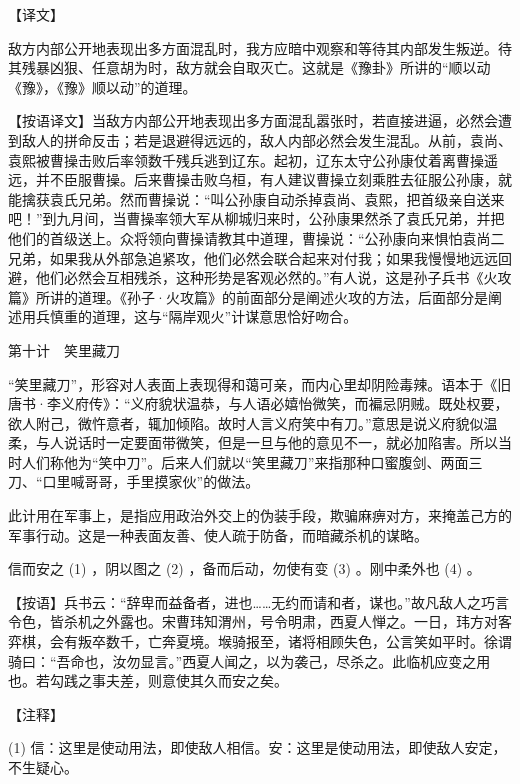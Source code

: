 \documentclass[12pt,UTF8]{ctexbook}
\begin{document}
【译文】


敌方内部公开地表现出多方面混乱时，我方应暗中观察和等待其内部发生叛逆。待其残暴凶狠、任意胡为时，敌方就会自取灭亡。这就是《豫卦》所讲的“顺以动《豫》，《豫》顺以动”的道理。

【按语译文】当敌方内部公开地表现出多方面混乱嚣张时，若直接进逼，必然会遭到敌人的拼命反击；若是退避得远远的，敌人内部必然会发生混乱。从前，袁尚、袁熙被曹操击败后率领数千残兵逃到辽东。起初，辽东太守公孙康仗着离曹操遥远，并不臣服曹操。后来曹操击败乌桓，有人建议曹操立刻乘胜去征服公孙康，就能擒获袁氏兄弟。然而曹操说：“叫公孙康自动杀掉袁尚、袁熙，把首级亲自送来吧！”到九月间，当曹操率领大军从柳城归来时，公孙康果然杀了袁氏兄弟，并把他们的首级送上。众将领向曹操请教其中道理，曹操说：“公孙康向来惧怕袁尚二兄弟，如果我从外部急追紧攻，他们必然会联合起来对付我；如果我慢慢地远远回避，他们必然会互相残杀，这种形势是客观必然的。”有人说，这是孙子兵书《火攻篇》所讲的道理。《孙子·火攻篇》的前面部分是阐述火攻的方法，后面部分是阐述用兵慎重的道理，这与“隔岸观火”计谋意思恰好吻合。





第十计　笑里藏刀


“笑里藏刀”，形容对人表面上表现得和蔼可亲，而内心里却阴险毒辣。语本于《旧唐书·李义府传》：“义府貌状温恭，与人语必嬉怡微笑，而褊忌阴贼。既处权要，欲人附己，微忤意者，辄加倾陷。故时人言义府笑中有刀。”意思是说义府貌似温柔，与人说话时一定要面带微笑，但是一旦与他的意见不一，就必加陷害。所以当时人们称他为“笑中刀”。后来人们就以“笑里藏刀”来指那种口蜜腹剑、两面三刀、“口里喊哥哥，手里摸家伙”的做法。

此计用在军事上，是指应用政治外交上的伪装手段，欺骗麻痹对方，来掩盖己方的军事行动。这是一种表面友善、使人疏于防备，而暗藏杀机的谋略。





信而安之 (1) ，阴以图之 (2) ，备而后动，勿使有变 (3) 。刚中柔外也 (4) 。

【按语】兵书云：“辞卑而益备者，进也……无约而请和者，谋也。”故凡敌人之巧言令色，皆杀机之外露也。宋曹玮知渭州，号令明肃，西夏人惮之。一日，玮方对客弈棋，会有叛卒数千，亡奔夏境。堠骑报至，诸将相顾失色，公言笑如平时。徐谓骑曰：“吾命也，汝勿显言。”西夏人闻之，以为袭己，尽杀之。此临机应变之用也。若勾践之事夫差，则意使其久而安之矣。





【注释】


(1) 信：这里是使动用法，即使敌人相信。安：这里是使动用法，即使敌人安定，不生疑心。
\end{document}
